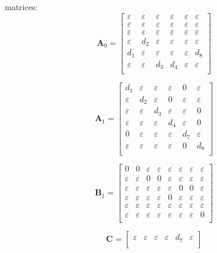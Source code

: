 \documentclass[11pt, a4paper, fleqn]{article}
\begin{document}
matrices:
\begin{equation*}
\mathbf{A}_{0} = 
\left[\begin{array}{ cccccc }
\varepsilon	&\varepsilon	&\varepsilon	&\varepsilon	&\varepsilon	&\varepsilon\\
\varepsilon	&\varepsilon	&\varepsilon	&\varepsilon	&\varepsilon	&\varepsilon\\
\varepsilon	&\varepsilon	&\varepsilon	&\varepsilon	&\varepsilon	&\varepsilon\\
\varepsilon	&d_2	&\varepsilon	&\varepsilon	&\varepsilon	&\varepsilon\\
d_1	&\varepsilon	&\varepsilon	&\varepsilon	&\varepsilon	&d_8\\
\varepsilon	&\varepsilon	&d_3	&d_4	&\varepsilon	&\varepsilon\\
\end{array}\right]
\end{equation*}

\begin{equation*}
\mathbf{A}_{1} = 
\left[\begin{array}{ cccccc }
d_1	&\varepsilon	&\varepsilon	&\varepsilon	&0	&\varepsilon\\
\varepsilon	&d_2	&\varepsilon	&0	&\varepsilon	&\varepsilon\\
\varepsilon	&\varepsilon	&d_3	&\varepsilon	&\varepsilon	&0\\
\varepsilon	&\varepsilon	&\varepsilon	&d_4	&\varepsilon	&0\\
0	&\varepsilon	&\varepsilon	&\varepsilon	&d_7	&\varepsilon\\
\varepsilon	&\varepsilon	&\varepsilon	&\varepsilon	&0	&d_8\\
\end{array}\right]
\end{equation*}

\begin{equation*}
\mathbf{B}_{1} = 
\left[\begin{array}{ cccccccc }
0	&0	&\varepsilon	&\varepsilon	&\varepsilon	&\varepsilon	&\varepsilon	&\varepsilon\\
\varepsilon	&\varepsilon	&0	&0	&\varepsilon	&\varepsilon	&\varepsilon	&\varepsilon\\
\varepsilon	&\varepsilon	&\varepsilon	&\varepsilon	&\varepsilon	&0	&0	&\varepsilon\\
\varepsilon	&\varepsilon	&\varepsilon	&\varepsilon	&0	&\varepsilon	&\varepsilon	&\varepsilon\\
\varepsilon	&\varepsilon	&\varepsilon	&\varepsilon	&\varepsilon	&\varepsilon	&\varepsilon	&\varepsilon\\
\varepsilon	&\varepsilon	&\varepsilon	&\varepsilon	&\varepsilon	&\varepsilon	&\varepsilon	&0\\
\end{array}\right]
\end{equation*}

\begin{equation*}
\mathbf{C}_{{}} = 
\left[\begin{array}{ cccccc }
\varepsilon	&\varepsilon	&\varepsilon	&\varepsilon	&d_7	&\varepsilon\\
\end{array}\right]
\end{equation*}
\end{document}
